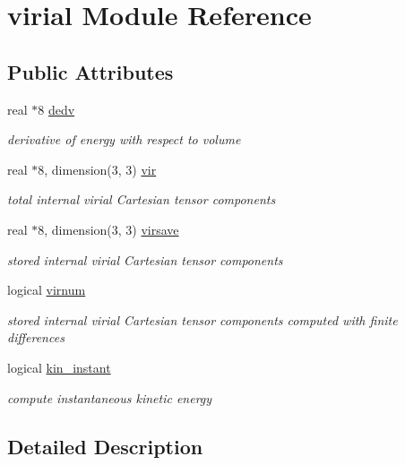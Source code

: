 \hypertarget{classvirial}{\section{virial Module Reference}
\label{classvirial}
}
\subsection*{Public Attributes}
\begin{DoxyCompactItemize}
\item 
real $\ast$8 \hyperlink{classvirial_aa9da403ba1215d1759ba52399c1af25c}{dedv}
\begin{DoxyCompactList}\small\item\em derivative of energy with respect to volume \end{DoxyCompactList}\item 
real $\ast$8, dimension(3, 3) \hyperlink{classvirial_a9d3855a65c2cea6288a7450d8540a1da}{vir}
\begin{DoxyCompactList}\small\item\em total internal virial Cartesian tensor components \end{DoxyCompactList}\item 
real $\ast$8, dimension(3, 3) \hyperlink{classvirial_a663e5aebd9b992869ea30af389ef32e2}{virsave}
\begin{DoxyCompactList}\small\item\em stored internal virial Cartesian tensor components \end{DoxyCompactList}\item 
logical \hyperlink{classvirial_aa0d0175e1cfd29907eb96e5e6b36644c}{virnum}
\begin{DoxyCompactList}\small\item\em stored internal virial Cartesian tensor components computed with finite differences \end{DoxyCompactList}\item 
logical \hyperlink{classvirial_a423276a83510de863f538f196a7aece6}{kin\-\_\-instant}
\begin{DoxyCompactList}\small\item\em compute instantaneous kinetic energy \end{DoxyCompactList}\end{DoxyCompactItemize}


\subsection{Detailed Description}


